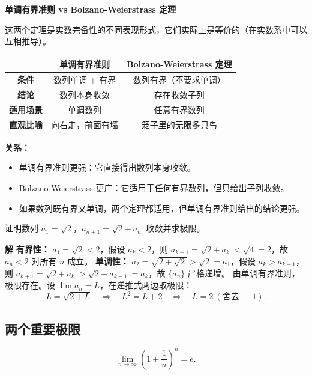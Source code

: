 \documentclass{ctexart}
\newenvironment{custom}[1]{\par\noindent \textbf{#1}\quad}{\par\vspace{1em}}
\begin{document}
\begin{custom}{单调有界准则 vs Bolzano-Weierstrass 定理}

这两个定理是实数完备性的不同表现形式，它们实际上是等价的（在实数系中可以互相推导）。

\begin{tabular}{|c|c|c|}
\hline
 & \textbf{单调有界准则} & \textbf{Bolzano-Weierstrass 定理} \\
\hline
\textbf{条件} & 数列单调 + 有界 & 数列有界（不要求单调） \\
\hline
\textbf{结论} & 数列本身收敛 & 存在收敛子列 \\
\hline
\textbf{适用场景} & 单调数列 & 任意有界数列 \\
\hline
\textbf{直观比喻} & 向右走，前面有墙 & 笼子里的无限多只鸟 \\
\hline
\end{tabular}

\textbf{关系：}
\begin{itemize}
\item 单调有界准则更强：它直接得出数列本身收敛。
\item Bolzano-Weierstrass 更广：它适用于任何有界数列，但只给出子列收敛。
\item 如果数列既有界又单调，两个定理都适用，但单调有界准则给出的结论更强。
\end{itemize}

\end{custom}


\begin{example}[重要例子]
证明数列 \(a_1 = \sqrt{2}\)，\(a_{n+1} = \sqrt{2 + a_n}\) 收敛并求极限。
\end{example}
\begin{custom}{解}
\textbf{有界性：} \(a_1 = \sqrt{2} < 2\)，假设 \(a_k < 2\)，则 \(a_{k+1} = \sqrt{2 + a_k} < \sqrt{4} = 2\)，故 \(a_n < 2\) 对所有 \(n\) 成立。
\textbf{单调性：} \(a_2 = \sqrt{2+\sqrt{2}} > \sqrt{2} = a_1\)，假设 \(a_k > a_{k-1}\)，则 \(a_{k+1} = \sqrt{2 + a_k} > \sqrt{2 + a_{k-1}} = a_k\)，故 \(\{a_n\}\) 严格递增。
由单调有界准则，极限存在。设 \(\lim a_n = L\)，在递推式两边取极限：
\[
L = \sqrt{2 + L} \quad\Longrightarrow\quad L^2 = L + 2 \quad\Longrightarrow\quad L = 2\ (\text{舍去 } -1).
\]
\end{custom}

\subsection{两个重要极限}

\begin{theorem}[第一个重要极限]
\[
\lim_{n\to\infty} \left(1 + \dfrac{1}{n}\right)^n = e.
\]
\end{theorem}
\end{document}
